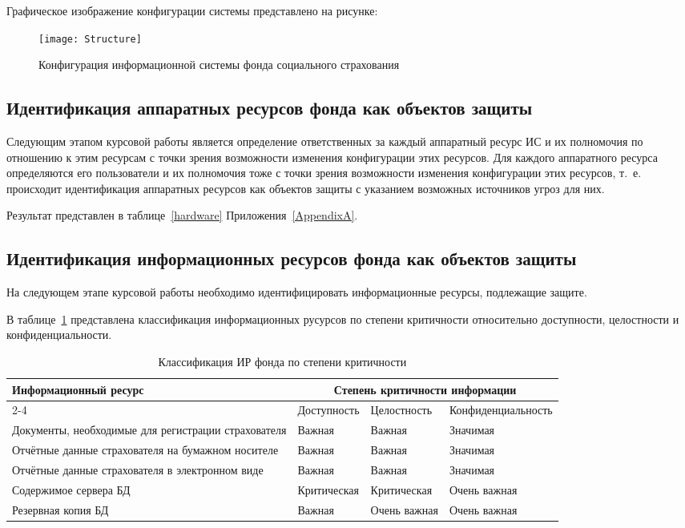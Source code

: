 \point Графическое изображение конфигурации системы представлено на рисунке:

\begin{figure}[h]
  \centering
  \texttt{[image: Structure]}
  \caption{Конфигурация информационной системы фонда социального страхования}
  \label{fig:structure}  
\end{figure}

\subsection{Идентификация аппаратных ресурсов
  фонда как объектов защиты}

\point Следующим этапом курсовой работы является определение ответственных за каждый аппаратный ресурс ИС и их полномочия по отношению к этим ресурсам с точки зрения возможности изменения конфигурации этих ресурсов. Для каждого аппаратного ресурса определяются его пользователи и их полномочия тоже с точки зрения возможности изменения конфигурации этих ресурсов, т.~е. происходит идентификация аппаратных ресурсов как объектов защиты с указанием возможных источников угроз для них.

\point Результат представлен в таблице~\ref{hardware} Приложения~\ref{AppendixA}.

\subsection{Идентификация информационных ресурсов
  фонда как объектов защиты}

\point На следующем этапе курсовой работы необходимо идентифицировать информационные ресурсы, подлежащие защите.

\point В таблице~\ref{tab:inf_resource} представлена классификация информационных русурсов по степени критичности относительно доступности, целостности и конфиденциальности.

\begin{table}[h]
\caption{Классификация ИР фонда по степени критичности}
\label{tab:inf_resource}
\small
\begin{tabular}{|p{5cm}|p{3cm}|p{3cm}|p{3cm}|}
\hline
\multirow{3}{4cm}{Информационный ресурс} & \multicolumn{3}{c|}{Степень
  критичности информации}\\\cline{2-4}
& Доступность & Целостность & Конфиденциаль\-ность \\\hline
Документы, необходимые для регистрации страхователя & Важная & Важная
& Значимая\\\hline
Отчётные данные страхователя на бумажном носителе & Важная & Важная &
Значимая \\\hline
Отчётные данные страхователя в электронном виде & Важная & Важная &
Значимая \\\hline
Содержимое сервера БД & Критическая & Критическая & Очень важная
\\\hline
Резервная копия БД & Важная & Очень важная & Очень важная
\\\hline
\end{tabular}
\end{table}
\normalsize

